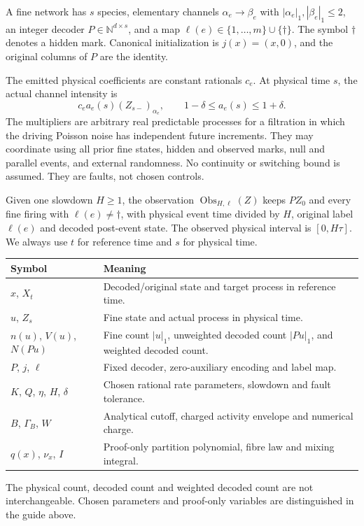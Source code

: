 \documentclass[11pt,reqno]{amsart}
\theoremstyle{definition}
\theoremstyle{remark}
\newcommand{\N}{\mathbb N}
\newcommand{\hid}{\dagger}
\DeclareMathOperator{\Obs}{Obs}
\begin{document}
A fine network has $s$ species, elementary channels
$\alpha_e\to\beta_e$ with $|\alpha_e|_1,|\beta_e|_1\le2$, an integer decoder
$P\in\N^{d\times s}$, and a map $\ell(e)\in\{1,\ldots,m\}\cup\{\hid\}$.
The symbol $\hid$ denotes a hidden mark. Canonical initialization is
$j(x)=(x,0)$, and the original columns of $P$ are the identity.

The emitted physical coefficients are constant rationals $c_e$. At physical
time $s$, the actual channel intensity is
\begin{equation}\label{eq:fault-rate}
 c_e a_e(s)(Z_{s-})_{\alpha_e},\qquad
 1-\delta\le a_e(s)\le1+\delta.
\end{equation}
The multipliers are arbitrary real predictable processes for a filtration in
which the driving Poisson noise has independent future increments. They may
coordinate using all prior fine states, hidden and observed marks, null and
parallel events, and external randomness. No continuity or switching bound is
assumed. They are faults, not chosen controls.

Given one slowdown $H\ge1$, the observation $\Obs_{H,\ell}(Z)$ keeps $PZ_0$
and every fine firing with $\ell(e)\ne\hid$, with physical event time divided
by $H$, original label $\ell(e)$ and decoded post-event state. The observed
physical interval is $[0,H\tau]$. We always use $t$ for reference time and $s$
for physical time.

\begin{center}
\small
\begin{tabular}{p{.20\linewidth}p{.70\linewidth}}
\toprule
Symbol & Meaning\\\midrule
$x$, $X_t$ & Decoded/original state and target process in reference time.\\
$u$, $Z_s$ & Fine state and actual process in physical time.\\
$n(u)$, $V(u)$, $N(Pu)$ & Fine count $|u|_1$, unweighted decoded count $|Pu|_1$, and weighted decoded count.\\
$P$, $j$, $\ell$ & Fixed decoder, zero-auxiliary encoding and label map.\\
$K$, $Q$, $\eta$, $H$, $\delta$ & Chosen rational rate parameters, slowdown and fault tolerance.\\
$B$, $\Gamma_B$, $W$ & Analytical cutoff, charged activity envelope and numerical charge.\\
$q(x)$, $\nu_x$, $I$ & Proof-only partition polynomial, fibre law and mixing integral.\\
\bottomrule
\end{tabular}
\end{center}
The physical count, decoded count and weighted decoded count are not
interchangeable. Chosen parameters and proof-only variables are distinguished
in the guide above.
\end{document}
